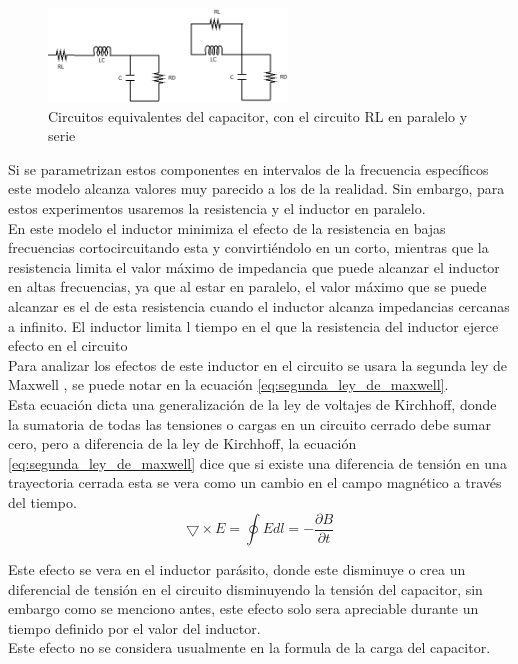\documentclass[journal]{IEEEtran}
\begin{document}
 \begin{figure}[hbtp]
 	\centering
 	\includegraphics[width=2.5in]{img/Circutos_equivalentes.png}
 	\caption{Circuitos equivalentes del capacitor, con el circuito RL en paralelo y serie}
 	\label{fig:circuitos_equivalentes}
 \end{figure} 
 Si se parametrizan estos componentes en intervalos de la frecuencia específicos este modelo alcanza valores muy parecido a los de la realidad. Sin embargo, para estos experimentos usaremos la resistencia y el inductor en paralelo.\\ En este modelo el inductor minimiza el efecto de la resistencia en bajas frecuencias cortocircuitando esta y convirtiéndolo en un corto, mientras que la resistencia limita el valor máximo de impedancia que puede alcanzar el inductor en altas frecuencias, ya que al estar en paralelo, el valor máximo que se puede alcanzar es el de esta resistencia cuando el inductor alcanza impedancias cercanas a infinito. El inductor limita l tiempo en el que la resistencia del inductor ejerce efecto en el circuito\\
 Para analizar los efectos de este inductor en el circuito se usara la segunda ley de Maxwell \cite{Saiku}, se puede notar en la ecuación \ref{eq:segunda_ley_de_maxwell}.\\
 Esta ecuación dicta una generalización de la ley de voltajes de Kirchhoff, donde la sumatoria de todas las tensiones o cargas en un circuito cerrado debe sumar cero, pero a diferencia de la ley de Kirchhoff, la ecuación \ref{eq:segunda_ley_de_maxwell} dice que si existe una diferencia de tensión en una trayectoria cerrada esta se vera como un cambio en el campo magnético a través del tiempo.\\
 
  \begin{equation}
  \label{eq:segunda_ley_de_maxwell}
  \bigtriangledown \times E=\oint Edl=-\frac{\partial B}{\partial t}
  \end{equation}
  
  Este efecto se vera en el inductor parásito, donde este disminuye o crea un diferencial de tensión en el circuito disminuyendo la tensión del capacitor, sin embargo como se menciono antes, este efecto solo sera apreciable durante un tiempo definido por el valor del inductor.\\ Este efecto no se considera usualmente en la formula de la carga del capacitor.
  
\end{document}

